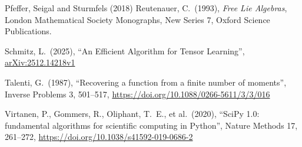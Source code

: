 \documentclass[11pt,english]{article}
\theoremstyle{definition}
\theoremstyle{remark}
\begin{document}
\begin{thebibliography}{Pfeffer, Seigal and Sturmfels (2018)}
Reutenauer, C.\ (1993),
\emph{Free Lie Algebras}, London Mathematical Society Monographs,
New Series 7, Oxford Science Publications.

Schmitz, L.\ (2025), ``An
Efficient Algorithm for Tensor Learning'',
\href{https://arxiv.org/abs/2512.14218v1}{arXiv:2512.14218v1}

Talenti, G.\ (1987), ``Recovering
a function from a finite number of moments'', Inverse Problems 3,
501--517,
\href{https://doi.org/10.1088/0266-5611/3/3/016}{https://doi.org/10.1088/0266-5611/3/3/016}

Virtanen, P., Gommers, R.,
Oliphant, T.~E., et al.\ (2020), ``SciPy 1.0: fundamental algorithms
for scientific computing in Python'', Nature Methods 17, 261--272,
\href{https://doi.org/10.1038/s41592-019-0686-2}{https://doi.org/10.1038/s41592-019-0686-2}

\end{thebibliography}
\endgroup

\clearpage
\end{document}
